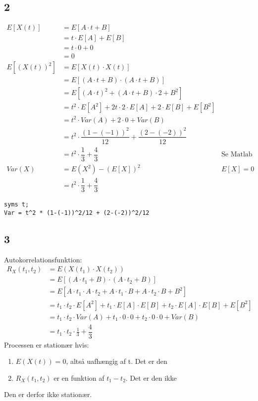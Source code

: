 \documentclass{article}
\begin{document}
\subsection*{2} %
\begin{align}
E\left[X(t) \right] &= E\left[A \cdot t + B\right] \\
	&= t \cdot E[A] + E[B] \\
	&= t \cdot 0 + 0 \\
	&= 0 \\
E \left[\left( X(t) \right)^2 \right] &= E \left[X(t) \cdot X(t) \right] \\
	&= E\left[(A \cdot t + B) \cdot (A \cdot t + B) \right] \\
	&= E\left[ (A \cdot t)^2 + (A \cdot t + B) \cdot 2 + B^2 \right] \\
	&= t^2 \cdot E\left[ A^2 \right] + 2t \cdot 2 \cdot E[A] + 2 \cdot E[B] + E\left[B^2 \right] \\
	&= t^2 \cdot Var(A) + 2 \cdot 0 + Var(B) \\
	&= t^2 \cdot \dfrac{\left( 1- (-1)\right)^2}{12} + \dfrac{\left( 2- (-2)\right)^2}{12} \\
	&= t^2 \cdot \dfrac{1}{3} + \dfrac{4}{3} & \text{Se Matlab herunder} \\
Var(X) &= E\left( X^2 \right) - \left( E[X] \right)^2 & E[X] = 0\\
	&= t^2 \cdot \dfrac{1}{3} + \dfrac{4}{3}
\end{align}

\begin{lstlisting}[caption=Opg 2.2, style=Code-Matlab, label=lst:Opg2.2]
syms t;
Var = t^2 * (1-(-1))^2/12 + (2-(-2))^2/12
\end{lstlisting}



\subsection*{3} %
Autokorrelationsfunktion:
\begin{align}
R_X(t_1, t_2) &= E\left( X(t_1) \cdot X(t_2) \right) \\
	&=E\left[ (A \cdot t_1 + B) \cdot (A \cdot t_2 + B)\right] \\
	&=E\left[ A \cdot t_1 \cdot A \cdot t_2 + A \cdot t_1 \cdot B + A \cdot t_2 \cdot B + B^2 \right] \\
	&= t_1 \cdot t_2 \cdot E\left[ A^2\right] + t_1 \cdot E[A] \cdot E[B] + t_2 \cdot E[A] \cdot E[B] + E\left[B^2\right] \\
	&= t_1 \cdot t_2 \cdot Var(A) + t_1 \cdot 0 \cdot 0 + t_2 \cdot 0 \cdot 0 + Var(B) \\
	&= t_1 \cdot t_2 \cdot \frac{1}{3} +  \dfrac{4}{3} 
\end{align}
Processen er stationær hvis:
\begin{enumerate}
	\item $E\left( X(t) \right) = 0$, altså uafhængig af t.
	\subitem Det er den
	\item $R_X(t_1, t_2)$ er en funktion af $t_1-t_2$.
	\subitem Det er den ikke
\end{enumerate}
Den er derfor ikke stationær.
\end{document}
